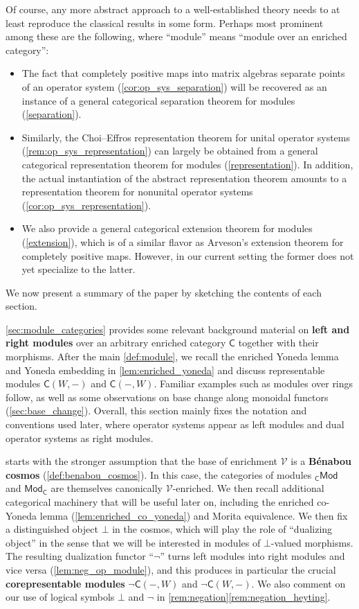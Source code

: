 \documentclass[11pt,onecolumn]{article}
\newcommand{\cV}{\mathscr{V}}
\newcommand{\cC}{\mathsf{C}}
\newcommand{\Mod}{\mathsf{Mod}}
\theoremstyle{plain}
\theoremstyle{remark}
\theoremstyle{definition}
\begin{document}
Of course, any more abstract approach to a well-established theory needs to at least reproduce the classical results in some form.
Perhaps most prominent among these are the following, where ``module'' means ``module over an enriched category'':
\begin{itemize}
	\item The fact that completely positive maps into matrix algebras separate points of an operator system (\cref{cor:op_sys_separation})
		will be recovered as an instance of a general categorical separation theorem for modules (\cref{separation}).
	\item Similarly, the Choi--Effros representation theorem for unital operator systems (\cref{rem:op_sys_representation})
		can largely be obtained from a general categorical representation theorem for modules (\cref{representation}).
		In addition, the actual instantiation of the abstract representation theorem amounts to a representation theorem for nonunital operator systems (\cref{cor:op_sys_representation}).
	\item We also provide a general categorical extension theorem for modules (\cref{extension}),
		which is of a similar flavor as Arveson's extension theorem for completely positive maps.
		However, in our current setting the former does not yet specialize to the latter.
\end{itemize}

We now present a summary of the paper by sketching the contents of each section.

\cref{sec:module_categories} provides some relevant background material on \textbf{left and right modules} over an arbitrary enriched category $\cC$
together with their morphisms.
After the main \cref{def:module}, we recall the enriched Yoneda lemma and Yoneda embedding in \cref{lem:enriched_yoneda}
and discuss representable modules $\cC(W, -)$ and $\cC(-, W)$.
Familiar examples such as modules over rings follow, as well as some observations on base change along monoidal functors (\cref{sec:base_change}).
Overall, this section mainly fixes the notation and conventions used later,
where operator systems appear as left modules and dual operator systems as right modules.

 starts with the stronger assumption that the base of enrichment $\cV$ is a \textbf{B\'enabou cosmos} (\cref{def:benabou_cosmos}).
In this case, the categories of modules ${}_\cC\Mod$ and $\Mod_\cC$ are themselves canonically $\cV$-enriched.
We then recall additional categorical machinery that will be useful later on,
including the enriched co-Yoneda lemma (\cref{lem:enriched_co_yoneda}) and Morita equivalence.
We then fix a distinguished object $\bot$ in the cosmos,
which will play the role of ``dualizing object'' in the sense that we will be interested in modules of $\bot$-valued morphisms.
The resulting dualization functor ``$\neg$'' turns left modules into right modules and vice versa (\cref{lem:neg_op_module}),
and this produces in particular the crucial \textbf{corepresentable modules} $\neg \cC(-, W)$ and $\neg \cC(W, -)$.
We also comment on our use of logical symbols $\bot$ and $\neg$ in \cref{rem:negation}\ref{rem:negation_heyting}.
\end{document}
